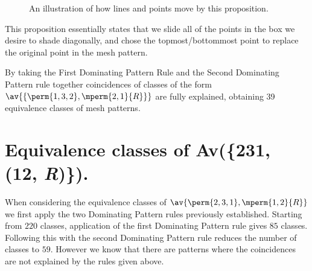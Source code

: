 \begin{figure}[ht]
\centering
{}
    \caption{An illustration of how lines and points move by this proposition.}
\end{figure}

This proposition essentially states that we slide all of the points in the box we desire
to shade diagonally, and chose the topmost/bottommost point to replace the original
point in the mesh pattern.

By taking the First Dominating Pattern Rule and the Second Dominating Pattern
rule together coincidences of classes of the form \(\av{\{\perm{1,3,2},\mperm{2,1}{R}\}}\)
are fully explained, obtaining 39 equivalence classes of mesh patterns.

\section{Equivalence classes of Av(\{231, (12, \textit{R})\}).}
When considering the equivalence classes of \(\av{\perm{2,3,1},\mperm{1,2}{R}}\)
we first apply the two Dominating Pattern rules previously established.
Starting from \(220\) classes, application of the first Dominating Pattern rule
gives \(85\) classes. Following this with the second Dominating Pattern rule
reduces the number of classes to \(59\). However we know that there are patterns
where the coincidences are not explained by the rules given above.

